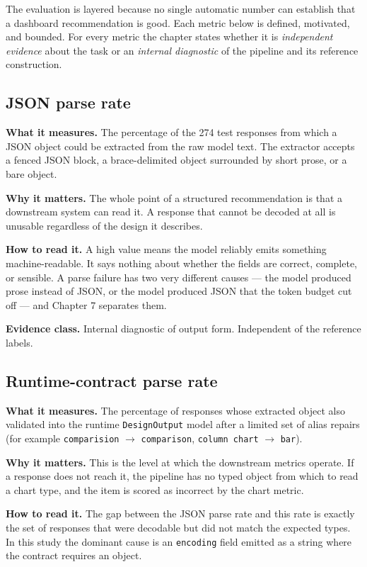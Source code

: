 The evaluation is layered because no single automatic number can establish that a dashboard recommendation is good. Each metric below is defined, motivated, and bounded. For every metric the chapter states whether it is \emph{independent evidence} about the task or an \emph{internal diagnostic} of the pipeline and its reference construction.

\subsection{JSON parse rate}

\textbf{What it measures.} The percentage of the 274 test responses from which a JSON object could be extracted from the raw model text. The extractor accepts a fenced JSON block, a brace-delimited object surrounded by short prose, or a bare object.

\textbf{Why it matters.} The whole point of a structured recommendation is that a downstream system can read it. A response that cannot be decoded at all is unusable regardless of the design it describes.

\textbf{How to read it.} A high value means the model reliably emits something machine-readable. It says nothing about whether the fields are correct, complete, or sensible. A parse failure has two very different causes --- the model produced prose instead of JSON, or the model produced JSON that the token budget cut off --- and Chapter 7 separates them.

\textbf{Evidence class.} Internal diagnostic of output form. Independent of the reference labels.

\subsection{Runtime-contract parse rate}

\textbf{What it measures.} The percentage of responses whose extracted object also validated into the runtime \texttt{DesignOutput} model after a limited set of alias repairs (for example \texttt{comparision} \(\rightarrow\) \texttt{comparison}, \texttt{column\ chart} \(\rightarrow\) \texttt{bar}).

\textbf{Why it matters.} This is the level at which the downstream metrics operate. If a response does not reach it, the pipeline has no typed object from which to read a chart type, and the item is scored as incorrect by the chart metric.

\textbf{How to read it.} The gap between the JSON parse rate and this rate is exactly the set of responses that were decodable but did not match the expected types. In this study the dominant cause is an \texttt{encoding} field emitted as a string where the contract requires an object.

